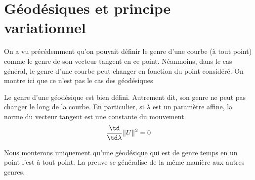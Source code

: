 \section{Géodésiques et principe variationnel}
On a vu précédemment qu'on pouvait définir le genre d'une courbe (à tout point) comme le genre de son vecteur tangent en ce point. Néanmoins, dans le cas général, le genre d'une courbe peut changer en fonction du point considéré. On montre ici que ce n'est pas le cas des géodésiques
\begin{theoremframe}
    \begin{propri}
        Le genre d'une géodésique est bien défini. Autrement dit, son genre ne peut pas changer le long de la courbe. En particulier, si $\lambda$ est un paramètre affine, la norme du vecteur tangent est une constante du mouvement.
        \begin{equation}
            \frac{\td}{\td\lambda}\lVert U \rVert^2 = 0
        \end{equation}
    \end{propri}
\end{theoremframe}
Nous monterons uniquement qu'une géodésique qui est de genre temps en un point l'est à tout point. La preuve se généralise de la même manière aux autres genres.
